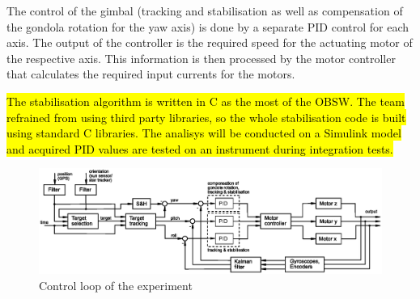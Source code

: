 The control of the gimbal (tracking and stabilisation as well as compensation of the gondola rotation for the yaw axis) is done by a separate PID control for each axis. The output of the controller is the required speed for the actuating motor of the respective axis. This information is then processed by the motor controller that calculates the required input currents for the motors.

\hl{The stabilisation algorithm is written in C as the most of the OBSW. The team refrained from using third party libraries, so the whole stabilisation code is built using standard C libraries. The analisys will be conducted on a Simulink model and acquired PID values are tested on an instrument during integration tests.}


\newpage
\begin{landscape}
	\begin{figure}
		\includegraphics[width=\linewidth]{4-experiment-design/img/software/Control_loop.eps}
		\caption{Control loop of the experiment}
		\label{fig::software::control_loop}
	\end{figure}
\end{landscape}


\raggedbottom

